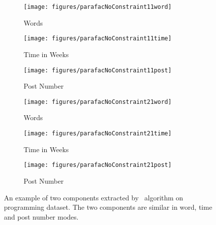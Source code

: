 \begin{figure*}
\captionsetup[subfigure]{aboveskip=-1pt,belowskip=-1pt}
  \centering   
\begin{subfigure}[b]{0.31\textwidth}
                \texttt{[image: figures/parafacNoConstraint11word]}
                \caption{Words}
                \label{fig:python_parafac_c1word}
        \end{subfigure}%
        \begin{subfigure}[b]{0.31\textwidth}
                \texttt{[image: figures/parafacNoConstraint11time]}
                \caption{Time in Weeks}
                \label{fig:python_parafac_c1time}
        \end{subfigure}%
\begin{subfigure}[b]{0.31\textwidth}
                \texttt{[image: figures/parafacNoConstraint11post]} 
                \caption{Post Number}
                \label{fig:python_parafac_c1post}
        \end{subfigure}%
        
                \begin{subfigure}[b]{0.31\textwidth}
                \texttt{[image: figures/parafacNoConstraint21word]}
                \caption{Words}
                \label{fig:python_parafac_c2word}
        \end{subfigure}%
        \begin{subfigure}[b]{0.31\textwidth}
                \texttt{[image: figures/parafacNoConstraint21time]}
                \caption{Time in Weeks}
                \label{fig:python_parafac_c2time}
        \end{subfigure}%
\begin{subfigure}[b]{0.31\textwidth}
                \texttt{[image: figures/parafacNoConstraint21post]}
                \caption{Post Number}
                \label{fig:python_parafac_c2post}
        \end{subfigure}%
        \caption{\label{fig:python_parafac}An example of two components extracted by \paraNS\ algorithm on programming dataset.  The two components are similar in word, time and post number modes. 
        }
\end{figure*}
\vspace{-0pt}

